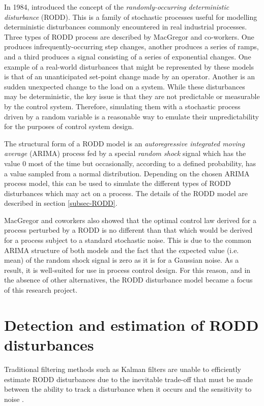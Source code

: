 In 1984, \cite{macgregor_duality_1984} introduced the concept of the \textit{randomly-occurring deterministic disturbance} (RODD). This is a family of stochastic processes useful for modelling deterministic disturbances commonly encountered in real industrial processes. Three types of RODD process are described by MacGregor and co-workers. One produces infrequently-occurring step changes, another produces a series of ramps, and a third produces a signal consisting of a series of exponential changes. One example of a real-world disturbances that might be represented by these models is that of an unanticipated set-point change made by an operator. Another is an sudden unexpected change to the load on a system. While these disturbances may be deterministic, the key issue is that they are not predictable or measurable by the control system. Therefore, simulating them with a stochastic process driven by a random variable is a reasonable way to emulate their unpredictability for the purposes of control system design.

The structural form of a RODD model is an \textit{autoregressive integrated moving average} (ARIMA) process fed by a special \textit{random shock} signal which has the value 0 most of the time but occasionally, according to a defined probability, has a value sampled from a normal distribution. Depending on the chosen ARIMA process model, this can be used to simulate the different types of RODD disturbances which may act on a process. The details of the RODD model are described in section \ref{subsec-RODD}.

MacGregor and coworkers also showed that the optimal control law derived for a process perturbed by a RODD is no different than that which would be derived for a process subject to a standard stochastic noise.  This is due to the common ARIMA structure of both models and the fact that the expected value (i.e. mean) of the random shock signal is zero as it is for a Gaussian noise. As a result, it is well-suited for use in process control design. For this reason, and in the absence of other alternatives, the RODD disturbance model became a focus of this research project.

\section*{Detection and estimation of RODD disturbances}\label{detection_RODDs}

Traditional filtering methods such as Kalman filters are unable to efficiently estimate RODD disturbances due to the inevitable trade-off that must be made between the ability to track a disturbance when it occurs and the sensitivity to noise \cite{robertson_detection_1995}.

